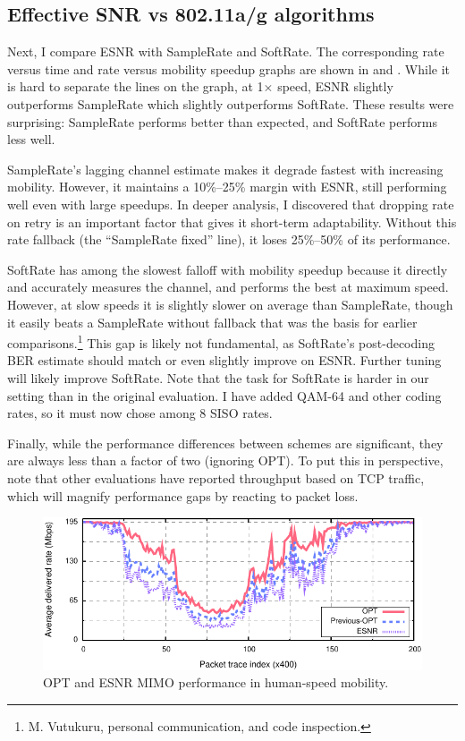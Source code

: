 \subsection{Effective SNR vs 802.11a/g algorithms}
Next, I compare ESNR with SampleRate and SoftRate. The corresponding rate versus time and rate versus mobility speedup graphs are shown 
in  and . While it is hard to separate the lines on the graph, at 1$\times$ speed, ESNR slightly outperforms SampleRate which slightly outperforms SoftRate. These results were surprising: SampleRate performs better than expected, and SoftRate performs less well. 


SampleRate's lagging channel estimate makes it degrade fastest with increasing mobility. However, it maintains a 10\%--25\% margin with ESNR, still performing well even with large speedups. In deeper analysis, I discovered that dropping rate on retry is an important factor that gives it short-term adaptability. Without this rate fallback (the ``SampleRate fixed'' line), it loses 25\%--50\% of its performance.

SoftRate has among the slowest falloff with mobility speedup because it directly and accurately measures the channel, and performs the best at maximum speed. However, at slow speeds it is slightly slower on average than SampleRate, though it easily beats a SampleRate without fallback that was the basis for earlier comparisons.\footnote{M. Vutukuru, personal communication, and code inspection.}
This gap is likely not fundamental, as SoftRate's post-decoding BER estimate should match or even slightly improve on ESNR. Further tuning will likely improve SoftRate. Note that the task for SoftRate is harder in our setting than in the original evaluation. I have added QAM-64 and other coding rates, so it must now chose among 8 SISO rates.

Finally, while the performance differences between schemes are significant, they are always less than a factor of two (ignoring OPT). To put this in perspective, note that other evaluations have reported throughput based on TCP traffic, which will magnify performance gaps by reacting to packet loss.

\begin{figure}[t]
      \centering
      \includegraphics[width=\textwidth]{figures/rate/mimo_skip_time.pdf}
      \caption[OPT and ESNR MIMO performance in human-speed mobility]{\label{fig:mimo_eff_snr_time} OPT and ESNR MIMO performance in human-speed mobility.}
\end{figure}

